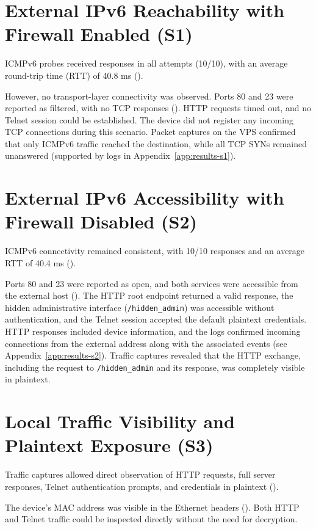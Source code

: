 \section{External IPv6 Reachability with Firewall Enabled (S1)}\label{sec:results-s1}
ICMPv6 probes received responses in all attempts (10/10), with an average round-trip time (RTT) of 40.8 ms ().

However, no transport-layer connectivity was observed. Ports 80 and 23 were reported as filtered, with no TCP responses (). HTTP requests timed out, and no Telnet session could be established. The device did not register any incoming TCP connections during this scenario.
Packet captures on the VPS confirmed that only ICMPv6 traffic reached the destination, while all TCP SYNs remained unanswered (supported by logs in Appendix~\ref{app:results-s1}).

\section{External IPv6 Accessibility with Firewall Disabled (S2)}\label{sec:results-s2}
ICMPv6 connectivity remained consistent, with 10/10 responses and an average RTT of 40.4 ms ().

Ports 80 and 23 were reported as open, and both services were accessible from the external host (). The HTTP root endpoint returned a valid response, the hidden administrative interface (\texttt{/hidden\_admin}) was accessible without authentication, and the Telnet session accepted the default plaintext credentials.
HTTP responses included device information, and the logs confirmed incoming connections from the external address along with the associated events (see Appendix~\ref{app:results-s2}). Traffic captures revealed that the HTTP exchange, including the request to \texttt{/hidden\_admin} and its response, was completely visible in plaintext.

\section{Local Traffic Visibility and Plaintext Exposure (S3)}\label{sec:results-s3}
Traffic captures allowed direct observation of HTTP requests, full server responses, Telnet authentication prompts, and credentials in plaintext ().

The device’s MAC address was visible in the Ethernet headers (). Both HTTP and Telnet traffic could be inspected directly without the need for decryption.
